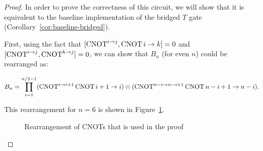 \begin{proof}
  In order to prove the correctness of this circuit, we will show that it is equivalent to the baseline implementation of the bridged $T$ gate (Corollary~\ref{cor:baseline-bridged}).
  
  First, using the fact that $[\operatorname{CNOT}^{i \to j}, \operatorname{CNOT}{i \to k}] = 0$ and $[\operatorname{CNOT}^{i \to j}, \operatorname{CNOT}^{k \to j}] = 0$, we can show that $B_n$ (for even $n$) could be rearranged as:

  \begin{equation}
    B_n = \prod_{i=1}^{n/2 - 1} (\operatorname{CNOT}^{i\to i+1}\operatorname{CNOT}{i+1\to i}) \otimes (\operatorname{CNOT}^{n-i\to n-i+1} \operatorname{CNOT}{n-i+1\to n-i}).
  \end{equation}

  This rearrangement for $n = 6$ is shown in Figure~\ref{fig:bridged-class-i-proof-a}.

  \begin{figure}[h!]
    \label{fig:bridged-class-i-proof-a}
    \centering
    \caption{Rearrangement of CNOTs that is used in the proof}
  \end{figure}


\end{proof}
